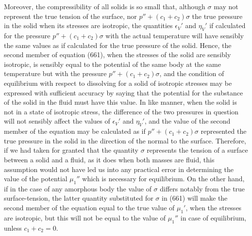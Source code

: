 \documentclass[12pt]{article}
\begin{document}
Moreover, the compressibility of all solids is so small that, although $\sigma$ may not represent the true tension of the surface, nor $p'' + (c_1 + c_2)\sigma$ the true pressure in the solid when its stresses are isotropic, the quantities $\epsilon_V'$ and $\eta_V'$ if calculated for the pressure $p'' + (c_1 + c_2)\sigma$ with the actual temperature will have sensibly the same values as if calculated for the true pressure of the solid. Hence, the second member of equation (661), when the stresses of the solid are sensibly isotropic, is sensibly equal to the potential of the same body at the same temperature but with the pressure $p'' + (c_1 + c_2)\sigma$, and the condition of equilibrium with respect to dissolving for a solid of isotropic stresses may be expressed with sufficient accuracy by saying that the potential for the substance of the solid in the fluid must have this value. In like manner, when the solid is not in a state of isotropic stress, the difference of the two pressures in question will not sensibly affect the values of $\epsilon_V'$ and $\eta_V'$, and the value of the second member of the equation may be calculated as if $p'' + (c_1 + c_2)\sigma$ represented the true pressure in the solid in the direction of the normal to the surface. Therefore, if we had taken for granted that the quantity $\sigma$ represents the tension of a surface between a solid and a fluid, as it does when both masses are fluid, this assumption would not have led us into any practical error in determining the value of the potential $\mu_1''$ which is necessary for equilibrium. On the other hand, if in the case of any amorphous body the value of $\sigma$ differs notably from the true surface-tension, the latter quantity substituted for $\sigma$ in (661) will make the second member of the equation equal to the true value of $\mu_1'$, when the stresses are isotropic, but this will not be equal to the value of $\mu_1''$ in case of equilibrium, unless $c_1 + c_2 =0$.
\end{document}
